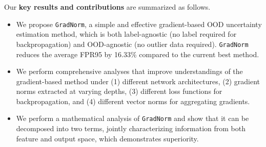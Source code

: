 \documentclass{article}
\begin{document}

Our \textbf{key results and contributions} are summarized as follows. 
\begin{itemize}
  \item We propose \texttt{GradNorm}, a simple and effective gradient-based OOD uncertainty estimation method, which is both label-agnostic (no label required for backpropagation) and OOD-agnostic (no outlier data required). \texttt{GradNorm} reduces the average FPR95 by {16.33\%} compared to the current best method.
  \item We perform comprehensive analyses that improve understandings of the gradient-based method under (1) different network architectures, (2) gradient norms extracted at varying depths, (3) different loss functions for backpropagation, and (4) different vector norms for aggregating gradients. 
  \item We perform a mathematical analysis of \texttt{GradNorm} and show that it can be decomposed into two terms, jointly characterizing information from both feature and output space, which demonstrates superiority. 
\end{itemize}
\end{document}
